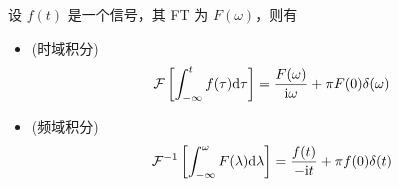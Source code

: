 \begin{property}[积分特性]
    设 $f(t)$ 是一个信号，其 FT 为 $F(\omega)$，则有
    \begin{itemize}
        \item (时域积分)
            \begin{align*}
                \mathcal{F}\left[\int_{-\infty}^{t}f(\tau)\mathrm{d}\tau\right] = \frac{F(\omega)}{\mathrm{i}\omega} + \pi F(0)\delta(\omega)
            \end{align*}
        \item (频域积分)
            \begin{align*}
                \mathcal{F}^{-1}\left[\int_{-\infty}^{\omega}F(\lambda)\mathrm{d}\lambda\right] = \frac{f(t)}{-\mathrm{i} t} + \pi f(0)\delta(t)
            \end{align*}
    \end{itemize}
\end{property}

